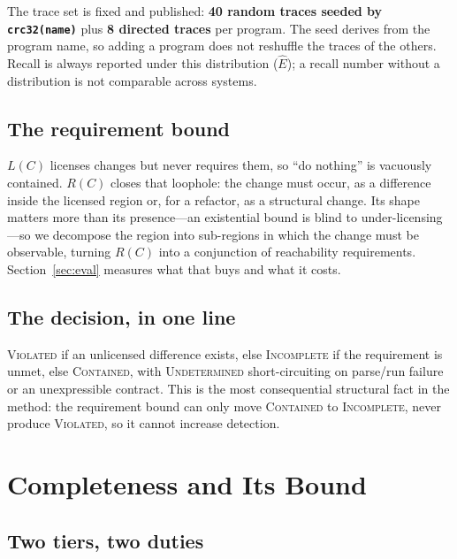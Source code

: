 \documentclass[acmsmall,screen,review,anonymous]{acmart}
\begin{document}
The trace set is fixed and published: \textbf{40 random traces seeded by \texttt{crc32(name)}} plus \textbf{8 directed traces} per program. The seed derives from the program name, so adding a program does not reshuffle the traces of the others. Recall is always reported under this distribution ($\hat{E}$); a recall number without a distribution is not comparable across systems.

\subsection{The requirement bound}

$L(C)$ licenses changes but never requires them, so ``do nothing'' is vacuously contained. $R(C)$ closes that loophole: the change must occur, as a difference inside the licensed region or, for a refactor, as a structural change. Its shape matters more than its presence---an existential bound is blind to under-licensing---so we decompose the region into sub-regions in which the change must be observable, turning $R(C)$ into a conjunction of reachability requirements. Section~\ref{sec:eval} measures what that buys and what it costs.

\subsection{The decision, in one line}

\textsc{Violated} if an unlicensed difference exists, else \textsc{Incomplete} if the requirement is unmet, else \textsc{Contained}, with \textsc{Undetermined} short-circuiting on parse/run failure or an unexpressible contract. This is the most consequential structural fact in the method: the requirement bound can only move \textsc{Contained} to \textsc{Incomplete}, never produce \textsc{Violated}, so it cannot increase detection.

\section{Completeness and Its Bound}
\label{sec:completeness}

\subsection{Two tiers, two duties}
\end{document}
